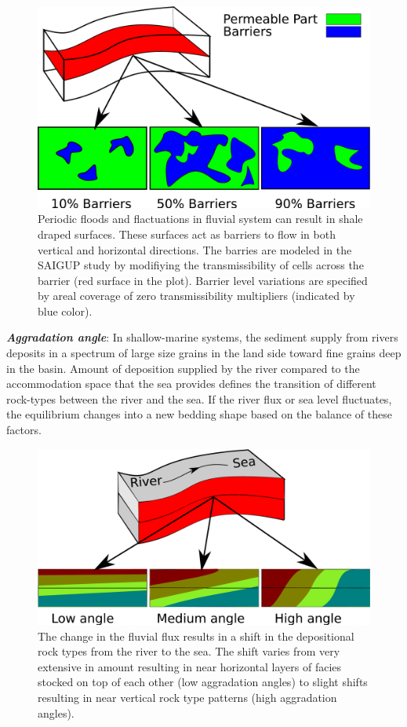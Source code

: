 \begin{figure}[thb]
  \centering
  \includegraphics[width=0.65 \linewidth]{./figurer/barrier} 
  \caption{Periodic floods and flactuations in fluvial system can result in shale draped surfaces. These surfaces act as barriers to flow in both vertical and horizontal directions. The barries are modeled in the SAIGUP study by modifiying the transmissibility of cells across the barrier (red surface in the plot). Barrier level variations are specified by areal coverage of zero transmissibility multipliers (indicated by blue color).}
  \label{fig:barriers}
%
\end{figure}

\textbf{\textit{Aggradation angle}}:
In shallow-marine systems, the sediment supply from rivers deposits in a
spectrum of large size grains in the land side toward fine grains deep in the
basin. Amount of deposition supplied by the river compared to the accommodation
space that the sea provides defines the transition of different rock-types
between the river and the sea. If the river flux or sea level
fluctuates, the equilibrium changes into a new bedding shape based on the
balance of these
factors.

\begin{figure}[thb]
  \centering
  \includegraphics[width=0.65 \linewidth]{./figurer/agr} 
  \caption{The change in the fluvial flux results in a shift in the depositional rock types from the river to the sea. The shift varies from very extensive in amount resulting in near horizontal layers of facies stocked on top of each other (low aggradation angles) to slight shifts resulting in near vertical rock type patterns (high aggradation angles).}
  \label{fig:agrLvl}
%
\end{figure}

